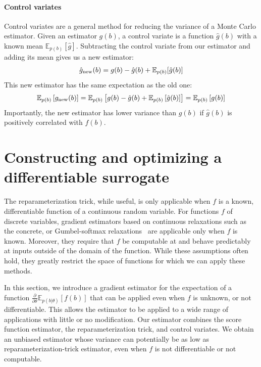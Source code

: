\documentclass{article}
\newcommand{\controlf}{\hat g}  %
\newcommand{\E}{\mathbb{E}}
\newcommand{\PT}{\frac{\partial}{\partial \theta}}
\begin{document}
\paragraph{Control variates}
Control variates are a general method for reducing the variance of a Monte Carlo estimator.
Given an estimator $g(b)$, a control variate is a function $\controlf(b)$ with a known mean $\mathbb{E}_{p(b)} [ \controlf ]$.
Subtracting the control variate from our estimator and adding its mean gives us a new estimator:
%
\begin{align}
\hat g_\textnormal{new}(b) = g(b) - \controlf(b) + \mathbb{E}_{p(b)}[\controlf(b)]
\end{align}
%
This new estimator has the same expectation as the old one:
%
\begin{align}
\mathbb{E}_{p(b)}\left[ g_\textnormal{new}(b) \right] 
= \mathbb{E}_{p(b)}\left[g(b) - \controlf(b) + \mathbb{E}_{p(b)} \left[ \controlf(b) \right] \right]
= \mathbb{E}_{p(b)}\left[ g(b) \right]
\end{align}
%
Importantly, the new estimator has lower variance than $g(b)$ if $\controlf(b)$ is positively correlated with $f(b)$.



\section{Constructing and optimizing a differentiable surrogate}
\label{lax section}
The reparameterization trick, while useful, is only applicable when $f$ is a known, differentiable function of a continuous random variable.
For functions $f$ of discrete variables, gradient estimators based on continuous relaxations such as the concrete, or Gumbel-softmax relaxations~\cite{maddison2016concrete, jang2016categorical} are applicable only when $f$ is known.
Moreover, they require that $f$ be computable at and behave predictably at inputs outside of the domain of the function.
While these assumptions often hold, they greatly restrict the space of functions for which we can apply these methods. 

In this section, we introduce a gradient estimator for the expectation of a function $\PT \E_{p(b|\theta)}[f(b)]$ that can be applied even when $f$ is unknown, or not differentiable.
This allows the estimator to be applied to a wide range of applications with little or no modification.
Our estimator combines the score function estimator, the reparameterization trick, and control variates.
We obtain an unbiased estimator whose variance can potentially be as low as reparameterization-trick estimator, even when $f$ is not differentiable or not computable.
\end{document}
